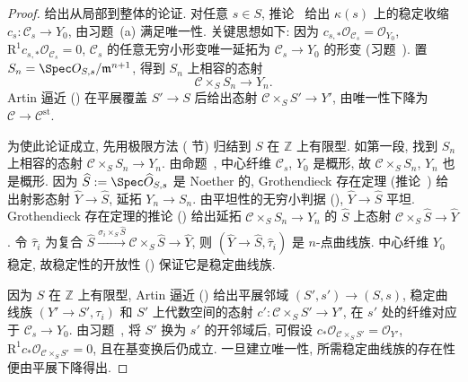 \begin{proof}
给出从局部到整体的论证. 对任意 $s\in S$, 推论~ 给出 $\kappa(s)$ 上的稳定收缩 $c_s:\mathcal C_s\to\allowbreak Y_0$, 由习题~(a) 满足唯一性. 关键思想如下: 因为 $c_{s,\allowbreak *}\mathcal O_{\mathcal C_s}=\mathcal O_{Y_0}$, $\mathrm R^1c_{s,\allowbreak *}\mathcal O_{\mathcal C_s}=0$, $\mathcal C_s$ 的任意无穷小形变唯一延拓为 $\mathcal C_s\to\allowbreak Y_0$ 的形变 (习题~). 置 $S_n=\Spec\mathcal O_{S,\allowbreak s}/\mathfrak m^{n+1}$, 得到 $S_n$ 上相容的态射
\[
\mathcal C\times_S S_n\to Y_n.
\]
Artin 逼近 () 在平展覆盖 $S'\to\allowbreak S$ 后给出态射 $\mathcal C\times_S S'\to\allowbreak Y'$, 由唯一性下降为 $\mathcal C\to\mathcal C^{\mathrm{st}}$.

为使此论证成立, 先用极限方法 ( 节) 归结到 $S$ 在 $\mathbb Z$ 上有限型. 如第一段, 找到 $S_n$ 上相容的态射 $\mathcal C\times_S S_n\to\allowbreak Y_n$. 由命题~, 中心纤维 $\mathcal C_s$, $Y_0$ 是概形, 故 $\mathcal C\times_S S_n$, $Y_n$ 也是概形. 因为 $\widehat S:=\Spec\widehat{\mathcal O}_{S,\allowbreak s}$ 是 Noether 的, Grothendieck 存在定理 (推论~) 给出射影态射 $\widehat Y\to\widehat S$, 延拓 $Y_n\to\allowbreak S_n$. 由平坦性的无穷小判据 (), $\widehat Y\to\widehat S$ 平坦. Grothendieck 存在定理的推论 () 给出延拓 $\mathcal C\times_S S_n\to\allowbreak Y_n$ 的 $\widehat S$ 上态射 $\mathcal C\times_S\widehat S\to\widehat Y$. 令 $\widehat\tau_i$ 为复合 $\widehat S\xrightarrow{\sigma_i\times_S\widehat S}\mathcal C\times_S\widehat S\to\widehat Y$, 则 $(\widehat Y\to\widehat S,\allowbreak \widehat\tau_i)$ 是 $n$-点曲线族. 中心纤维 $Y_0$ 稳定, 故稳定性的开放性 () 保证它是稳定曲线族.

因为 $S$ 在 $\mathbb Z$ 上有限型, Artin 逼近 () 给出平展邻域 $(S',\allowbreak s')\to(S,\allowbreak s)$, 稳定曲线族 $(Y'\to\allowbreak S',\allowbreak \tau_i)$ 和 $S'$ 上代数空间的态射 $c':\mathcal C\times_S S'\to\allowbreak Y'$, 在 $s'$ 处的纤维对应于 $\mathcal C_s\to\allowbreak Y_0$. 由习题~, 将 $S'$ 换为 $s'$ 的开邻域后, 可假设 $c_*\mathcal O_{\mathcal C\times_S S'}=\mathcal O_{Y'}$, $\mathrm R^1c_*\mathcal O_{\mathcal C\times_S S'}=0$, 且在基变换后仍成立. 一旦建立唯一性, 所需稳定曲线族的存在性便由平展下降得出.


\end{proof}
